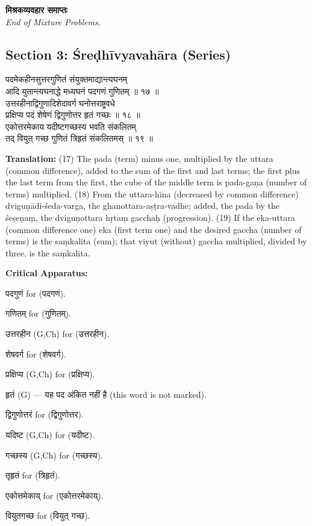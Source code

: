 \documentclass[11pt,a4paper]{article}
\newcommand{\dev}[1]{{\devanagarifont #1}}
\newcommand{\sanskritcol}[1]{%
  \begin{minipage}[t]{0.47\textwidth}
  \vspace{0pt}
  \begin{flushleft}
  #1
  \end{flushleft}
  \end{minipage}%
  \hfill
}
\newcommand{\englishcol}[1]{%
  \begin{minipage}[t]{0.47\textwidth}
  \vspace{0pt}
  \begin{flushleft}
  #1
  \end{flushleft}
  \end{minipage}%
}
\newenvironment{variants}{%
  \small%
  \color{varecolor}%
  \list{}{\leftmargin=2em\itemindent=-1em}%
}{\endlist}
\begin{document}
\vspace{0.3cm}
\begin{center}
\dev{\textbf{मिश्रकव्यवहार समाप्तः}}\\
\textit{End of Mixture Problems.}
\end{center}

\subsection*{Section 3: Śreḍhīvyavahāra (Series)}

\noindent
\sanskritcol{\dev{पदमेकहीनसुत्तरगुणितं संयुक्तमाद्यान्त्यघनम्} \\ \dev{आदि युतान्त्यघनाद्धे मध्यघनं पदगणं गुणितम् ॥ १७ ॥} \\[0.2cm]
\dev{उत्तरहीनाद्विगुणादिशेदावर्ग घनोत्तराष्ट्रवधे} \\ \dev{प्रक्षिप्य पदं शेषेणं द्विगुणोत्तर हृतं गच्छः ॥ १८ ॥} \\[0.2cm]
\dev{एकोत्तरमेकाय यदीष्टगच्छस्य भवति संकलितम्} \\ \dev{तद् वियुत् गच्छ गुणितं त्रिहृतं संकलितमस् ॥ १९ ॥}}
\englishcol{\textbf{Translation:} (17) The pada (term) minus one, multiplied by the uttara
(common difference), added to the sum of the first and last terms; the first plus
the last term from the first, the cube of the middle term is pada-gaṇa (number of
terms) multiplied. (18) From the uttara-hīna (decreased by common difference)
dviguṇādi-śeda-varga, the ghanottara-aṣṭra-vadhe; added, the pada by the śeṣeṇaṃ,
the dviguṇottara hṛtaṃ gacchaḥ (progression). (19) If the eka-uttara (common
difference one) eka (first term one) and the desired gaccha (number of terms) is
the saṃkalita (sum); that viyut (without) gaccha multiplied, divided by three,
is the saṃkalita.}

\vspace{0.4cm}
\textcolor{varecolor}{\textbf{Critical Apparatus:}}
\begin{variants}
\item[17.1] \dev{पदगुणं} \dev{for} (\dev{पदगणं}).
\item[17.2] \dev{गणितम्} \dev{for} (\dev{गुणितम्}).
\item[18.1] \dev{उत्तरहीन} (G,Ch) \dev{for} (\dev{उत्तरहीन}).
\item[18.2] \dev{शेषवर्ग} \dev{for} (\dev{शेषवर्ग}).
\item[18.3] \dev{प्रक्षिप्य} (G,Ch) \dev{for} (\dev{प्रक्षिप्य}).
\item[18.4] \dev{हृतं} (G) --- \dev{यह पद अंकित नहीं है} (this word is not marked).
\item[18.5] \dev{द्विगुणोत्तरं} \dev{for} (\dev{द्विगुणोत्तर}).
\item[19.1] \dev{यदिष्ट} (G,Ch) \dev{for} (\dev{यदीष्ट}).
\item[19.2] \dev{गच्छस्य} (G,Ch) \dev{for} (\dev{गच्छस्य}).
\item[19.3] \dev{तृहृतं} \dev{for} (\dev{त्रिहृतं}).
\item[19.4] \dev{एकोत्तमेकाय्} \dev{for} (\dev{एकोत्तरमेकाय्}).
\item[19.5] \dev{वियुतगच्छ} \dev{for} (\dev{वियुत् गच्छ}).
\end{variants}
\end{document}
